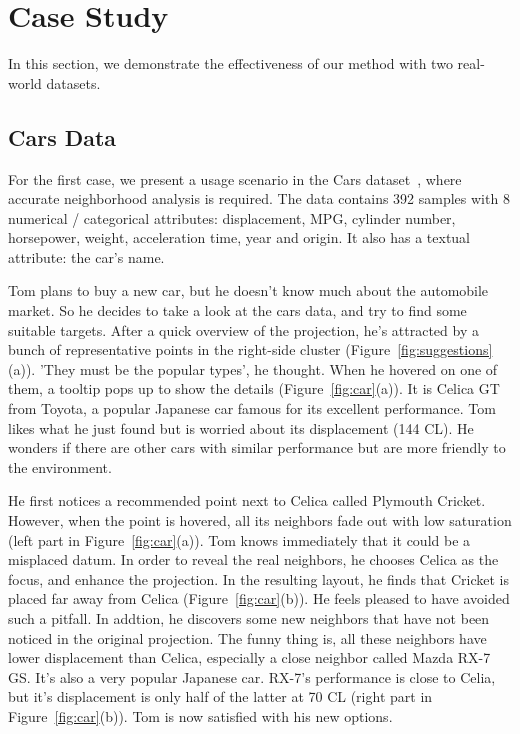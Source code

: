 \section{Case Study}
\label{section:casestudy}
In this section, we demonstrate the effectiveness of our method with two real-world datasets.

\subsection{Cars Data} 
\label{case:car}
  
For the first case, we present a usage scenario in the Cars dataset~\cite{Lichman:2013}, where accurate neighborhood analysis is required. The data contains 392 samples with 8 numerical / categorical attributes: displacement, MPG, cylinder number, horsepower, weight, acceleration time, year and origin. It also has a textual attribute: the car's name.
  
Tom plans to buy a new car, but he doesn't know much about the automobile market. So he decides to take a look at the cars data, and try to find some suitable targets. After a quick overview of the projection, he's attracted by a bunch of representative points in the right-side cluster (Figure~\ref{fig:suggestions}(a)). 'They must be the popular types', he thought. When he hovered on one of them, a tooltip pops up to show the details (Figure~\ref{fig:car}(a)). It is Celica GT from Toyota, a popular Japanese car famous for its excellent performance. Tom likes what he just found but is worried about its displacement (144 CL). He wonders if there are other cars with similar performance but are more friendly to the environment.

He first notices a recommended point next to Celica called Plymouth Cricket. However, when the point is hovered, all its neighbors fade out with low saturation (left part in Figure~\ref{fig:car}(a)). Tom knows immediately that it could be a misplaced datum. In order to reveal the real neighbors, he chooses Celica as the focus, and enhance the projection. In the resulting layout, he finds that Cricket is placed far away from Celica (Figure~\ref{fig:car}(b)). He feels pleased to have avoided such a pitfall. In addtion, he discovers some new neighbors that have not been noticed in the original projection. The funny thing is, all these neighbors have lower displacement than Celica, especially a close neighbor called Mazda RX-7 GS. It's also a very popular Japanese car. RX-7's performance is close to Celia, but it's displacement is only half of the latter at 70 CL (right part in Figure~\ref{fig:car}(b)). Tom is now satisfied with his new options.

